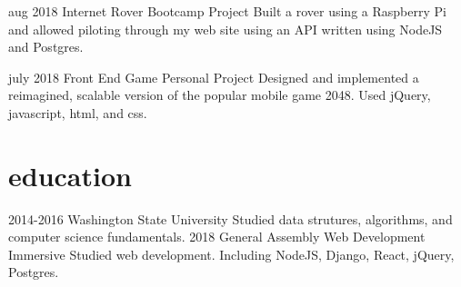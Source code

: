 \documentclass[]{friggeri-cv}
\begin{document}
\begin{entrylist}

  \entry
    {aug 2018}
    {Internet Rover}
    {Bootcamp Project}
    {Built a rover using a Raspberry Pi and allowed piloting through my web site using an API written using NodeJS and Postgres.}

  \entry
    {july 2018}
    {Front End Game}
    {Personal Project}
    {Designed and implemented a reimagined, scalable version of the popular mobile game 2048. Used jQuery, javascript, html, and css.}

\end{entrylist}


\section{education}

\begin{entrylist}
  \entry
    {2014-2016}
    {Washington State University}
    {}
    {Studied data strutures, algorithms, and computer science fundamentals.}
  \entry
    {2018}
    {General Assembly}
    {Web Development Immersive}
    {Studied web development. Including NodeJS, Django, React, jQuery, Postgres.}

\end{entrylist}
\end{document}
